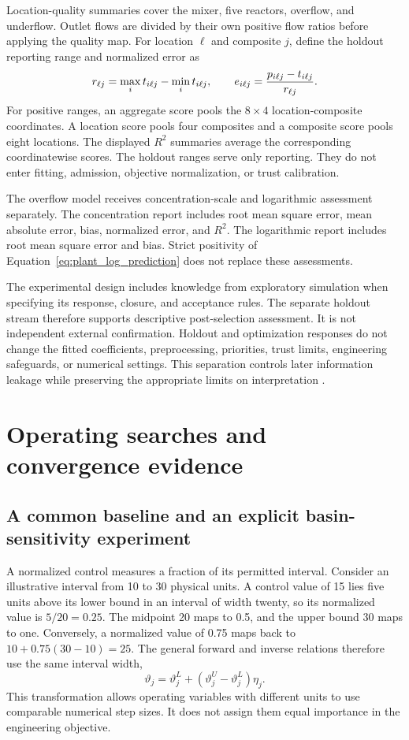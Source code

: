 Location-quality summaries cover the mixer, five reactors, overflow, and underflow. Outlet flows are divided by their own positive flow ratios before applying the quality map. For location $\ell$ and composite $j$, define the holdout reporting range and normalized error as
\begin{equation}
\equationname{Holdout-range normalization of a location-quality error}
r_{\ell j}=\max_it_{i\ell j}-\min_it_{i\ell j},\qquad
e_{i\ell j}=\frac{p_{i\ell j}-t_{i\ell j}}{r_{\ell j}}.
\end{equation}
For positive ranges, an aggregate score pools the $8\times4$ location-composite coordinates. A location score pools four composites and a composite score pools eight locations. The displayed $R^2$ summaries average the corresponding coordinatewise scores. The holdout ranges serve only reporting. They do not enter fitting, admission, objective normalization, or trust calibration.

The overflow model receives concentration-scale and logarithmic assessment separately. The concentration report includes root mean square error, mean absolute error, bias, normalized error, and $R^2$. The logarithmic report includes root mean square error and bias. Strict positivity of Equation~\eqref{eq:plant_log_prediction} does not replace these assessments.

The experimental design includes knowledge from exploratory simulation when specifying its response, closure, and acceptance rules. The separate holdout stream therefore supports descriptive post-selection assessment. It is not independent external confirmation. Holdout and optimization responses do not change the fitted coefficients, preprocessing, priorities, trust limits, engineering safeguards, or numerical settings. This separation controls later information leakage while preserving the appropriate limits on interpretation \citep{Kaufman2012}.

\section{Operating searches and convergence evidence}

\subsection{A common baseline and an explicit basin-sensitivity experiment}

A normalized control measures a fraction of its permitted interval. Consider an illustrative interval from 10 to 30 physical units. A control value of 15 lies five units above its lower bound in an interval of width twenty, so its normalized value is $5/20=0.25$. The midpoint 20 maps to 0.5, and the upper bound 30 maps to one. Conversely, a normalized value of 0.75 maps back to $10+0.75(30-10)=25$. The general forward and inverse relations therefore use the same interval width,
\[
\vartheta_j=\vartheta_j^L+(\vartheta_j^U-\vartheta_j^L)\eta_j.
\]
This transformation allows operating variables with different units to use comparable numerical step sizes. It does not assign them equal importance in the engineering objective.

